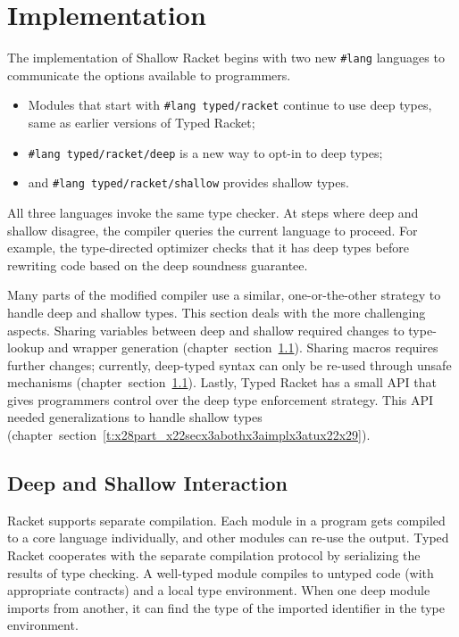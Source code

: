 \documentclass[ twoside,open=right,titlepage,numbers=noenddot,headinclude,%
                footinclude=true,cleardoublepage=empty,abstract=off,
                BCOR=5mm,paper=a4,fontsize=11pt,%
                ngerman,american,%
                parts,pdfspacing]{scrreprt}
\newcommand{\SecRef}[2]{section~#1}
\newcommand{\SecRefLocal}[3]{\hyperref[#1]{\SecRef{#2}{#3}}}
\newcommand{\Scribtexttt}[1]{{\texttt{#1}}}
\newlength{\stabLeft}
\newcommand{\atItemizeStart}[0]{\addtolength{\stabLeft}{\labelsep}
                                \addtolength{\stabLeft}{\labelwidth}}
\let\SOriginalthesubsubsection\thesubsubsection
\newcommand{\Ssubsection}[2]{\subsection[#1]{#2}\let\thesubsubsection\SOriginalthesubsubsection}
\newcommand{\Ssubsubsection}[2]{\subsubsection[#1]{#2}}
\renewcommand{\Ssubsection}[2]{\section[#1]{#2}}
\renewcommand{\Ssubsubsection}[2]{\subsection[#1]{#2}}
\renewcommand{\SecRefLocal}[3]{section~\ref{#1}}
\begin{document}
\Ssubsection{Implementation}{Implementation}\label{t:x28part_x22secx3abothx3aimplementationx22x29}

The implementation of Shallow Racket begins with two new \Scribtexttt{\#lang}
 languages to communicate the options available to programmers.


\noindent \begin{itemize}\atItemizeStart

\item Modules that start with \Scribtexttt{\#lang typed/racket} continue to use deep types,
 same as earlier versions of Typed Racket;

\item \Scribtexttt{\#lang typed/racket/deep} is a new way to opt{-}in to deep types;

\item and \Scribtexttt{\#lang typed/racket/shallow} provides shallow types.\end{itemize}

\noindent \noindent{}All three languages invoke the same type checker.
At steps where deep and shallow disagree,
 the compiler queries the current language to proceed.
For example, the type{-}directed optimizer checks that it has deep types
 before rewriting code based on the deep soundness guarantee.

Many parts of the modified compiler use a similar, one{-}or{-}the{-}other strategy
 to handle deep and shallow types.
This section deals with the more challenging aspects.
Sharing variables between deep and shallow required changes to
 type{-}lookup and wrapper generation (chapter~\SecRefLocal{t:x28part_x22secx3abothx3aimplx3acodex22x29}{6.2.1}{Deep and Shallow Interaction}).
Sharing macros requires further changes; currently, deep{-}typed syntax can only
 be re{-}used through unsafe mechanisms (chapter~\SecRefLocal{t:x28part_x22secx3abothx3aimplx3acodex22x29}{6.2.1}{Deep and Shallow Interaction}).
Lastly, Typed Racket has a small API that gives programmers control
 over the deep type enforcement strategy.
This API needed generalizations to handle shallow types (chapter~\SecRefLocal{t:x28part_x22secx3abothx3aimplx3atux22x29}{6.2.3}{Deep{--}Untyped Utilities}).

\Ssubsubsection{Deep and Shallow Interaction}{Deep and Shallow Interaction}\label{t:x28part_x22secx3abothx3aimplx3acodex22x29}

Racket supports separate compilation.
Each module in a program gets compiled to a core language individually, and
 other modules can re{-}use the output.
Typed Racket cooperates with the separate compilation protocol by serializing
 the results of type checking.
A well{-}typed module compiles to untyped code (with appropriate contracts)
 and a local type environment.
When one deep module imports from another, it can find the type of the
 imported identifier in the type environment.
\end{document}
